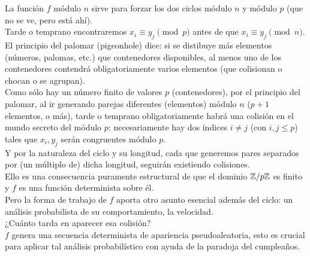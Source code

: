 La función $f$ módulo $n$ sirve para forzar los dos ciclos módulo $n$ y módulo $p$ (que no se ve, pero está ahí). \\
Tarde o temprano encontraremos $x_i \equiv y_j \pmod p $ antes de que $x_i \equiv y_j \pmod n $. \\
El principio del palomar (pigeonhole) dice: si se distibuye más elementos (números, palomas, etc.) que contenedores disponibles, al menos uno de los contenedores contendrá obligatoriamente varios elementos (que colisionan o chocan o se agrupan). \\
Como sólo hay un número finito de valores $p$ (contenedores), por el principio del palomar, al ir generando parejas diferentes (elementos) módulo $n$ ($p+1$ elementos, o más), tarde o temprano obligatoriamente habrá una colisión en el mundo secreto del módulo $p$: necesariamente hay dos índices $i \neq j$ (con $i,j \leq p$) tales que $x_i,y_j$ serán congruentes módulo $p$. \\
Y por la naturaleza del ciclo y su longitud, cada que generemos pares separados por (un múltiplo de) dicha longitud, seguirán existiendo colisiones. \\
Ello es una consecuencia puramente estructural de que el dominio $\mathbb{Z}/p\mathbb{Z}$ es finito y $f$ es una función determinista sobre él. \\

Pero la forma de trabajo de $f$ aporta otro asunto esencial además del ciclo: un análisis probabilista de su comportamiento, la velocidad. \\
¿Cuánto tarda en aparecer esa colisión? \\
$f$ genera una secuencia determinista de apariencia pseudoaleatoria, esto es crucial para aplicar tal análisis probabilístico con ayuda de la paradoja del cumpleaños. \\

